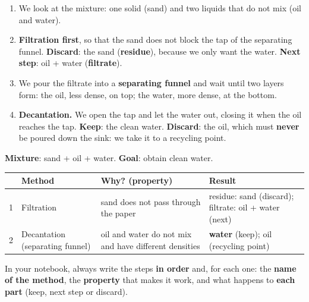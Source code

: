 \begin{enumerate}[label=\numberballmDarkTeal]
    \item We look at the mixture: one solid (sand) and two liquids that do not mix (oil and water).
    \item \textbf{Filtration first}, so that the sand does not block the tap of the separating funnel. \textcolor{red!70!black}{\textbf{Discard}}: the sand (\textbf{residue}), because we only want the water. \textcolor{blue!70!black}{\textbf{Next step}}: oil + water (\textbf{filtrate}).
    \item We pour the filtrate into a \textbf{separating funnel} and wait until two layers form: the oil, less dense, on top; the water, more dense, at the bottom.
    \item \textbf{Decantation.} We open the tap and let the water out, closing it when the oil reaches the tap. \textcolor{green!50!black}{\textbf{Keep}}: the clean water. \textcolor{red!70!black}{\textbf{Discard}}: the oil, which must \textbf{never} be poured down the sink: we take it to a recycling point.
\end{enumerate}

\begin{tcolorbox}[enhanced, breakable, colback=yellow!6!white, colframe=ocre, boxrule=0.8pt, arc=2mm,
    fonttitle=\sffamily\bfseries, title={How to write it in your notebook}]
    \textbf{Mixture}: sand + oil + water. \quad \textbf{Goal}: obtain clean water.

    \begin{tabular}{@{}p{0.3cm}>{\raggedright\arraybackslash}p{2.9cm}>{\raggedright\arraybackslash}p{3.9cm}>{\raggedright\arraybackslash}p{4.2cm}@{}}
        \toprule
        & \textbf{Method} & \textbf{Why? (property)} & \textbf{Result} \\
        \midrule
        1 & Filtration & sand does not pass through the paper & residue: sand (discard); filtrate: oil + water (next) \\
        2 & Decantation (separating funnel) & oil and water do not mix and have different densities & \textbf{water} (keep); oil (recycling point) \\
        \bottomrule
    \end{tabular}
\end{tcolorbox}

\begin{marker}
    In your notebook, always write the steps \textbf{in order} and, for each one: the \textbf{name of the method}, the \textbf{property} that makes it work, and what happens to \textbf{each part} (keep, next step or discard).
\end{marker}

